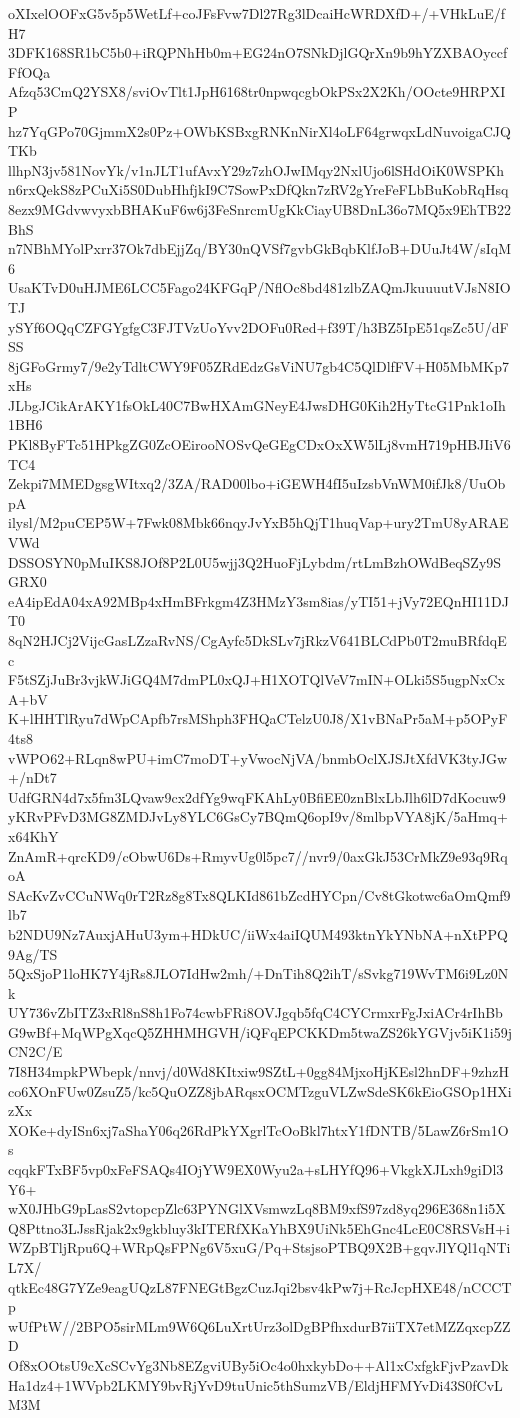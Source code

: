 oXIxelOOFxG5v5p5WetLf+coJFsFvw7Dl27Rg3lDcaiHcWRDXfD+/+VHkLuE/fH7
3DFK168SR1bC5b0+iRQPNhHb0m+EG24nO7SNkDjlGQrXn9b9hYZXBAOyccfFfOQa
Afzq53CmQ2YSX8/sviOvTlt1JpH6168tr0npwqcgbOkPSx2X2Kh/OOcte9HRPXIP
hz7YqGPo70GjmmX2s0Pz+OWbKSBxgRNKnNirXl4oLF64grwqxLdNuvoigaCJQTKb
llhpN3jv581NovYk/v1nJLT1ufAvxY29z7zhOJwIMqy2NxlUjo6lSHdOiK0WSPKh
n6rxQekS8zPCuXi5S0DubHhfjkI9C7SowPxDfQkn7zRV2gYreFeFLbBuKobRqHsq
8ezx9MGdvwvyxbBHAKuF6w6j3FeSnrcmUgKkCiayUB8DnL36o7MQ5x9EhTB22BhS
n7NBhMYolPxrr37Ok7dbEjjZq/BY30nQVSf7gvbGkBqbKlfJoB+DUuJt4W/sIqM6
UsaKTvD0uHJME6LCC5Fago24KFGqP/NflOc8bd481zlbZAQmJkuuuutVJsN8IOTJ
ySYf6OQqCZFGYgfgC3FJTVzUoYvv2DOFu0Red+f39T/h3BZ5IpE51qsZc5U/dFSS
8jGFoGrmy7/9e2yTdltCWY9F05ZRdEdzGsViNU7gb4C5QlDlfFV+H05MbMKp7xHs
JLbgJCikArAKY1fsOkL40C7BwHXAmGNeyE4JwsDHG0Kih2HyTtcG1Pnk1oIh1BH6
PKl8ByFTc51HPkgZG0ZcOEirooNOSvQeGEgCDxOxXW5lLj8vmH719pHBJIiV6TC4
Zekpi7MMEDgsgWItxq2/3ZA/RAD00lbo+iGEWH4fI5uIzsbVnWM0ifJk8/UuObpA
ilysl/M2puCEP5W+7Fwk08Mbk66nqyJvYxB5hQjT1huqVap+ury2TmU8yARAEVWd
DSSOSYN0pMuIKS8JOf8P2L0U5wjj3Q2HuoFjLybdm/rtLmBzhOWdBeqSZy9SGRX0
eA4ipEdA04xA92MBp4xHmBFrkgm4Z3HMzY3sm8ias/yTI51+jVy72EQnHI11DJT0
8qN2HJCj2VijcGasLZzaRvNS/CgAyfc5DkSLv7jRkzV641BLCdPb0T2muBRfdqEc
F5tSZjJuBr3vjkWJiGQ4M7dmPL0xQJ+H1XOTQlVeV7mIN+OLki5S5ugpNxCxA+bV
K+lHHTlRyu7dWpCApfb7rsMShph3FHQaCTelzU0J8/X1vBNaPr5aM+p5OPyF4ts8
vWPO62+RLqn8wPU+imC7moDT+yVwocNjVA/bnmbOclXJSJtXfdVK3tyJGw+/nDt7
UdfGRN4d7x5fm3LQvaw9cx2dfYg9wqFKAhLy0BfiEE0znBlxLbJlh6lD7dKocuw9
yKRvPFvD3MG8ZMDJvLy8YLC6GsCy7BQmQ6opI9v/8mlbpVYA8jK/5aHmq+x64KhY
ZnAmR+qrcKD9/cObwU6Ds+RmyvUg0l5pc7//nvr9/0axGkJ53CrMkZ9e93q9RqoA
SAcKvZvCCuNWq0rT2Rz8g8Tx8QLKId861bZcdHYCpn/Cv8tGkotwc6aOmQmf9lb7
b2NDU9Nz7AuxjAHuU3ym+HDkUC/iiWx4aiIQUM493ktnYkYNbNA+nXtPPQ9Ag/TS
5QxSjoP1loHK7Y4jRs8JLO7IdHw2mh/+DnTih8Q2ihT/sSvkg719WvTM6i9Lz0Nk
UY736vZbITZ3xRl8nS8h1Fo74cwbFRi8OVJgqb5fqC4CYCrmxrFgJxiACr4rIhBb
G9wBf+MqWPgXqcQ5ZHHMHGVH/iQFqEPCKKDm5twaZS26kYGVjv5iK1i59jCN2C/E
7I8H34mpkPWbepk/nnvj/d0Wd8KItxiw9SZtL+0gg84MjxoHjKEsl2hnDF+9zhzH
co6XOnFUw0ZsuZ5/kc5QuOZZ8jbARqsxOCMTzguVLZwSdeSK6kEioGSOp1HXizXx
XOKe+dyISn6xj7aShaY06q26RdPkYXgrlTcOoBkl7htxY1fDNTB/5LawZ6rSm1Os
cqqkFTxBF5vp0xFeFSAQs4IOjYW9EX0Wyu2a+sLHYfQ96+VkgkXJLxh9giDl3Y6+
wX0JHbG9pLasS2vtopcpZlc63PYNGlXVsmwzLq8BM9xfS97zd8yq296E368n1i5X
Q8Pttno3LJssRjak2x9gkbluy3kITERfXKaYhBX9UiNk5EhGnc4LcE0C8RSVsH+i
WZpBTljRpu6Q+WRpQsFPNg6V5xuG/Pq+StsjsoPTBQ9X2B+gqvJlYQl1qNTiL7X/
qtkEc48G7YZe9eagUQzL87FNEGtBgzCuzJqi2bsv4kPw7j+RcJcpHXE48/nCCCTp
wUfPtW//2BPO5sirMLm9W6Q6LuXrtUrz3olDgBPfhxdurB7iiTX7etMZZqxcpZZD
Of8xOOtsU9cXcSCvYg3Nb8EZgviUBy5iOc4o0hxkybDo++Al1xCxfgkFjvPzavDk
Ha1dz4+1WVpb2LKMY9bvRjYvD9tuUnic5thSumzVB/EldjHFMYvDi43S0fCvLM3M
